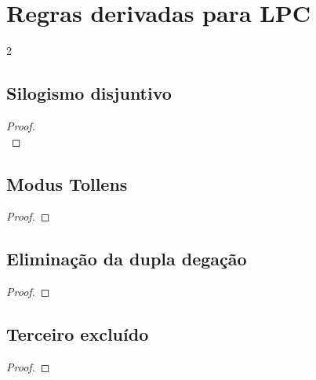 \newpage
\section{Regras derivadas para LPC}
\begin{multicols}{2}
\subsection*{Silogismo disjuntivo}
\begin{proof}
\\	
\end{proof}

\subsection*{Modus Tollens}

\begin{proof}
	 
\end{proof}

\subsection*{Eliminação da dupla degação}
	\begin{proof}
	\end{proof}


\subsection*{Terceiro excluído}
	\begin{proof}
		\open
		\close
		\open
		\close
	\end{proof}

%
%


\end{multicols}

